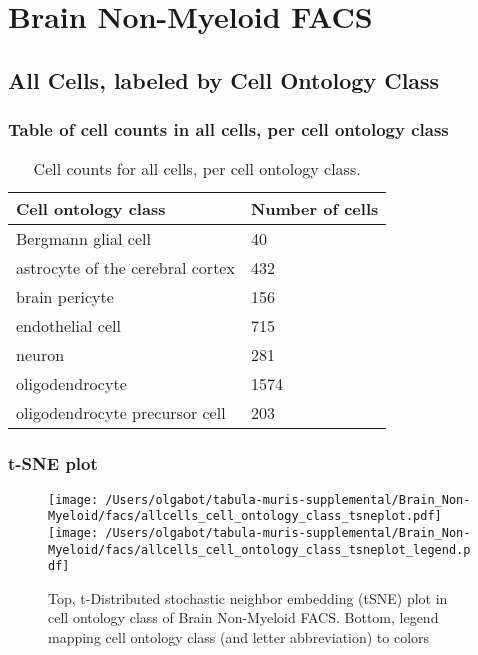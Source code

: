 \clearpage
\section{Brain Non-Myeloid FACS}

\subsection{All Cells, labeled by Cell Ontology Class}
\subsubsection{Table of cell counts in all cells, per cell ontology class}\begin{table}[h]
\centering
\label{my-label}
\begin{tabular}{@{}ll@{}}
\toprule

Cell ontology class& Number of cells \\ \midrule
Bergmann glial cell & 40 \\

astrocyte of the cerebral cortex & 432 \\

brain pericyte & 156 \\

endothelial cell & 715 \\

neuron & 281 \\

oligodendrocyte & 1574 \\

oligodendrocyte precursor cell & 203 \\
\bottomrule
\end{tabular}
\caption{Cell counts for all cells, per cell ontology class.}
\end{table}

\clearpage
\subsubsection{t-SNE plot}
\begin{figure}[h]
\centering
\texttt{[image: /Users/olgabot/tabula-muris-supplemental/Brain\_Non-Myeloid/facs/allcells\_cell\_ontology\_class\_tsneplot.pdf]}
\texttt{[image: /Users/olgabot/tabula-muris-supplemental/Brain\_Non-Myeloid/facs/allcells\_cell\_ontology\_class\_tsneplot\_legend.pdf]}
\caption{Top, t-Distributed stochastic neighbor embedding (tSNE) plot  in cell ontology class of Brain Non-Myeloid FACS. Bottom, legend mapping cell ontology class (and letter abbreviation) to colors}
\end{figure}


